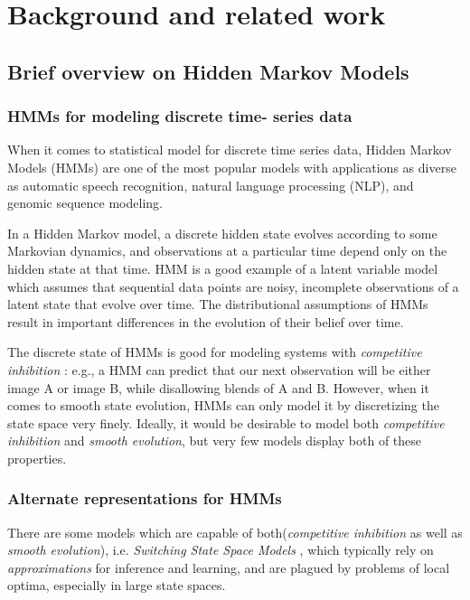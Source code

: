 \section{Background and related work}

\subsection{Brief overview on Hidden Markov Models}

\subsubsection{HMMs for modeling discrete time- series data}

When it comes to statistical model for discrete time series data, Hidden Markov Models (HMMs) \cite{ref1} are one of the most popular models with applications as diverse as automatic speech recognition, natural language processing (NLP), and genomic sequence modeling. 

In a Hidden Markov model, a discrete hidden state evolves according to some Markovian dynamics, and observations at a particular time depend only on the hidden state at that time\cite{ref2}.
\newline
\newline
HMM is a good example of a latent variable model which assumes
that sequential data points are noisy, incomplete observations
of a latent state that evolve over time.
The distributional assumptions of HMMs result
in important differences in the evolution of their belief
over time.

The discrete state of HMMs is good for modeling systems with \textit{competitive inhibition} \cite{ref7}: e.g., a
HMM can predict that our next observation will be either image A or image B, while disallowing blends of A and B. \newline
\newline
However, when it comes to smooth state evolution, HMMs can only model it by discretizing the state space very finely. 
Ideally, it would be desirable to model both \textit{competitive inhibition} and \textit{smooth evolution}, but very few models display both of these properties.

\subsubsection{Alternate representations for HMMs}

There are some models which are capable of both(\textit{competitive inhibition} as well as \textit{smooth evolution}), i.e. \textit{Switching State Space
Models} \cite{ref8}, which typically rely
on \textit{approximations} for inference and learning, and are plagued by problems of local optima, especially in large state spaces.
\par

